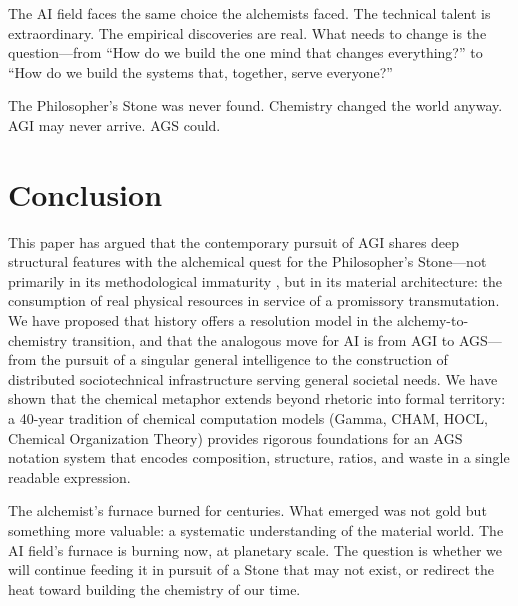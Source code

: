 \documentclass[12pt]{article}
\begin{document}
The AI field faces the same choice the alchemists faced. The technical talent is extraordinary. The empirical discoveries are real. What needs to change is the question---from ``How do we build the one mind that changes everything?'' to ``How do we build the systems that, together, serve everyone?''

The Philosopher's Stone was never found. Chemistry changed the world anyway. AGI may never arrive. AGS could.

\section{Conclusion}
\label{sec:conclusion}

This paper has argued that the contemporary pursuit of AGI shares deep structural features with the alchemical quest for the Philosopher's Stone---not primarily in its methodological immaturity \citep{dreyfus1965,rahimi2017}, but in its material architecture: the consumption of real physical resources in service of a promissory transmutation. We have proposed that history offers a resolution model in the alchemy-to-chemistry transition, and that the analogous move for AI is from AGI to AGS---from the pursuit of a singular general intelligence to the construction of distributed sociotechnical infrastructure serving general societal needs. We have shown that the chemical metaphor extends beyond rhetoric into formal territory: a 40-year tradition of chemical computation models (Gamma, CHAM, HOCL, Chemical Organization Theory) provides rigorous foundations for an AGS notation system that encodes composition, structure, ratios, and waste in a single readable expression.

The alchemist's furnace burned for centuries. What emerged was not gold but something more valuable: a systematic understanding of the material world. The AI field's furnace is burning now, at planetary scale. The question is whether we will continue feeding it in pursuit of a Stone that may not exist, or redirect the heat toward building the chemistry of our time.



\end{document}
